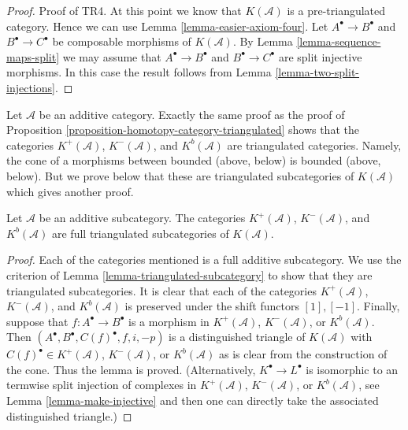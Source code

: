 \begin{proof}
\medskip\noindent
Proof of TR4. At this point we know that $K(\mathcal{A})$
is a pre-triangulated category. Hence we can use
Lemma \ref{lemma-easier-axiom-four}. Let $A^\bullet \to B^\bullet$
and $B^\bullet \to C^\bullet$ be composable morphisms of
$K(\mathcal{A})$. By Lemma \ref{lemma-sequence-maps-split} we may assume that
$A^\bullet \to B^\bullet$ and $B^\bullet \to C^\bullet$
are split injective morphisms. In this case the result follows
from Lemma \ref{lemma-two-split-injections}.
\end{proof}

\begin{remark}
\label{remark-boundedness-conditions-triangulated}
Let $\mathcal{A}$ be an additive category.
Exactly the same proof as the proof of
Proposition \ref{proposition-homotopy-category-triangulated}
shows that the categories
$K^{+}(\mathcal{A})$, $K^{-}(\mathcal{A})$, and $K^b(\mathcal{A})$
are triangulated categories. Namely, the cone of a morphisms between
bounded (above, below) is bounded (above, below).
But we prove below that these are triangulated subcategories
of $K(\mathcal{A})$ which gives another proof.
\end{remark}

\begin{lemma}
\label{lemma-bounded-triangulated-subcategories}
Let $\mathcal{A}$ be an additive subcategory. The categories
$K^{+}(\mathcal{A})$, $K^{-}(\mathcal{A})$, and $K^b(\mathcal{A})$
are full triangulated subcategories of $K(\mathcal{A})$.
\end{lemma}

\begin{proof}
Each of the categories mentioned is a full additive subcategory.
We use the criterion of 
Lemma \ref{lemma-triangulated-subcategory}
to show that they are triangulated subcategories.
It is clear that each of the categories 
$K^{+}(\mathcal{A})$, $K^{-}(\mathcal{A})$, and $K^b(\mathcal{A})$
is preserved under the shift functors $[1], [-1]$.
Finally, suppose that $f : A^\bullet \to B^\bullet$ is a morphism
in $K^{+}(\mathcal{A})$, $K^{-}(\mathcal{A})$, or $K^b(\mathcal{A})$.
Then $(A^\bullet, B^\bullet, C(f)^\bullet, f, i, -p)$ is a distinguished
triangle of $K(\mathcal{A})$ with $C(f)^\bullet \in K^{+}(\mathcal{A})$,
$K^{-}(\mathcal{A})$, or $K^b(\mathcal{A})$ as is clear from the construction
of the cone. Thus the lemma is proved. (Alternatively,
$K^\bullet \to L^\bullet$ is isomorphic to an termwise split injection
of complexes in $K^{+}(\mathcal{A})$, $K^{-}(\mathcal{A})$, or
$K^b(\mathcal{A})$, see
Lemma \ref{lemma-make-injective}
and then one can directly take the associated
distinguished triangle.)
\end{proof}

